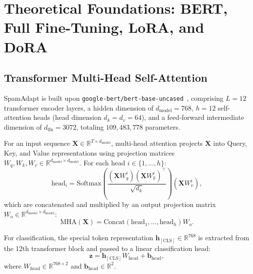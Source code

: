 \documentclass[conference]{IEEEtran}
\begin{document}
\section{Theoretical Foundations: BERT, Full Fine-Tuning, LoRA, and DoRA}
\label{sec:theory}

\subsection{Transformer Multi-Head Self-Attention}
SpamAdapt is built upon \texttt{google-bert/bert-base-uncased}~\cite{devlin2019bert}, comprising $L = 12$ transformer encoder layers, a hidden dimension of $d_{\text{model}} = 768$, $h = 12$ self-attention heads (head dimension $d_k = d_v = 64$), and a feed-forward intermediate dimension of $d_{\text{ffn}} = 3072$, totaling $109,483,778$ parameters.

For an input sequence $\mathbf{X} \in \mathbb{R}^{T \times d_{\text{model}}}$, multi-head attention projects $\mathbf{X}$ into Query, Key, and Value representations using projection matrices $W_q, W_k, W_v \in \mathbb{R}^{d_{\text{model}} \times d_{\text{model}}}$. For each head $i \in \{1, \dots, h\}$:
\begin{equation}
    \text{head}_i = \text{Softmax}\left( \frac{(\mathbf{X}W_q^i)(\mathbf{X}W_k^i)^\top}{\sqrt{d_k}} \right)(\mathbf{X}W_v^i),
    \label{eq:attention}
\end{equation}
which are concatenated and multiplied by an output projection matrix $W_o \in \mathbb{R}^{d_{\text{model}} \times d_{\text{model}}}$:
\begin{equation}
    \text{MHA}(\mathbf{X}) = \text{Concat}(\text{head}_1, \dots, \text{head}_h)W_o.
    \label{eq:mha}
\end{equation}

For classification, the special token representation $\mathbf{h}_{[\text{CLS}]} \in \mathbb{R}^{768}$ is extracted from the 12th transformer block and passed to a linear classification head:
\begin{equation}
    \mathbf{z} = \mathbf{h}_{[\text{CLS}]} W_{\text{head}} + \mathbf{b}_{\text{head}},
    \label{eq:cls_head}
\end{equation}
where $W_{\text{head}} \in \mathbb{R}^{768 \times 2}$ and $\mathbf{b}_{\text{head}} \in \mathbb{R}^2$.
\end{document}
